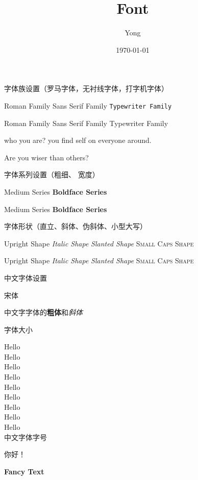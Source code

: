 \documentclass[10pt]{article}
\title{Font}
\author{Yong}
\date{\today}
\newcommand{\myfont}{\textbf{\textsf{Fancy Text}}}
\begin{document}
	\maketitle
	
	字体族设置（罗马字体，无衬线字体，打字机字体）
	
	\textrm{Roman Family} \textsf{Sans Serif Family} \texttt{Typewriter Family}
	
	{\rmfamily Roman Family} {\sffamily Sans Serif Family} {\ttfamily Typewriter Family}
	
	{\sffamily who you are? you find self on everyone around.}
	
	{\ttfamily Are you wiser than others?}
	
	字体系列设置（粗细、 宽度）
	
	\textmd{Medium Series} \textbf{Boldface Series}
	
	{\mdseries Medium Series} {\bfseries Boldface Series }
	
	字体形状（直立、斜体、伪斜体、小型大写）
	
	\textup{Upright Shape} \textit{Italic Shape}
	\textsl{Slanted Shape} \textsc{Small Caps Shape}
	
	{\upshape Upright Shape} {\itshape Italic Shape} {\slshape Slanted Shape} {\scshape Small Caps Shape}
	
	中文字体设置
	
	{\songti 宋体}   
	
	中文字字体的{\bfseries 粗体}和{\itshape 斜体}
	
	字体大小
	
	{\tiny Hello}\\
	{\scriptsize Hello}\\
	{\footnotesize Hello}\\
	{\small Hello}\\
	{\normalsize Hello}\\
	{\large Hello}\\
	{\Large Hello}\\
	{\huge Hello}\\
	{\Huge Hello}\\
	
	中文字体字号
	
	 你好！
	
	\myfont
	
\end{document}
